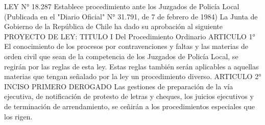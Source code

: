 LEY N° 18.287 Establece procedimiento ante los Juzgados de Policía Local
    (Publicada en el "Diario Oficial" N° 31.791, de 7 de febrero de 1984)
    La Junta de Gobierno de la República de Chile ha dado su aprobación al siguiente
    PROYECTO DE LEY:
    TITULO I
    Del Procedimiento Ordinario
    ARTICULO 1° El conocimiento de los procesos por contravenciones y faltas y las materias de orden civil que sean de la competencia de los Juzgados de Policía Local, se regirán por las reglas de esta ley.
    Estas reglas también serán aplicables a aquellas materias que tengan señalado por la ley un procedimiento diverso.
    ARTICULO 2° INCISO PRIMERO DEROGADO
    Las gestiones de preparación de la vía ejecutiva, de notificación de protesto de letras y cheques, los juicios ejecutivos y de terminación de arrendamiento, se ceñirán a los procedimientos especiales que los rigen.

